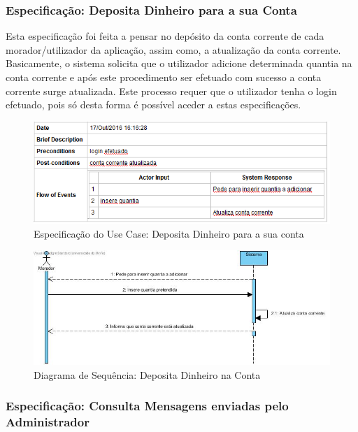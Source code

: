 \subsubsection{Especificação: Deposita Dinheiro para a sua Conta }
Esta especificação foi feita a pensar no depósito da conta corrente de cada morador/utilizador da aplicação, assim como,  a atualização da conta corrente. Basicamente, o sistema solicita que o utilizador adicione determinada quantia na conta corrente e após este procedimento ser efetuado com sucesso a conta corrente surge atualizada. Este processo requer que o utilizador tenha o login efetuado, pois só desta forma é possível aceder a estas especificações.  
\begin{figure}[htb!]
	\centering
	\includegraphics[scale=0.6]{imagens/Especificacoes/depositadinheiro}  
	\caption{Especificação do Use Case: Deposita Dinheiro para a sua conta  }  
\end{figure}

\begin{figure}[htb!]
	\centering
	\includegraphics[scale=0.5]{imagens/diagramaSeq/DepositaDinheiroConta}  
	\caption{Diagrama de Sequência: Deposita Dinheiro na Conta}  
\end{figure}

\newpage

\subsubsection{Especificação: Consulta Mensagens enviadas pelo Administrador }

